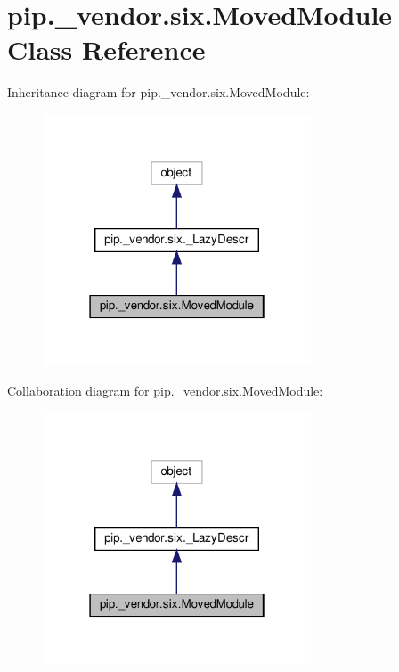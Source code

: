 \hypertarget{classpip_1_1__vendor_1_1six_1_1MovedModule}{}\section{pip.\+\_\+vendor.\+six.\+Moved\+Module Class Reference}
\label{classpip_1_1__vendor_1_1six_1_1MovedModule}


Inheritance diagram for pip.\+\_\+vendor.\+six.\+Moved\+Module\+:
\nopagebreak
\begin{figure}[H]
\begin{center}
\leavevmode
\includegraphics[width=226pt]{classpip_1_1__vendor_1_1six_1_1MovedModule__inherit__graph}
\end{center}
\end{figure}


Collaboration diagram for pip.\+\_\+vendor.\+six.\+Moved\+Module\+:
\nopagebreak
\begin{figure}[H]
\begin{center}
\leavevmode
\includegraphics[width=226pt]{classpip_1_1__vendor_1_1six_1_1MovedModule__coll__graph}
\end{center}
\end{figure}
